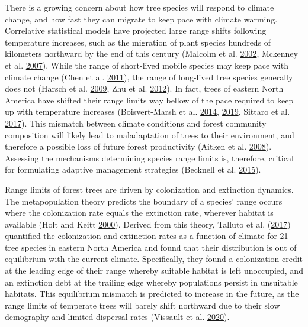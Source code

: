 \documentclass[12pt]{article}
\begin{document}
There is a growing concern about how tree species will respond to
climate change, and how fast they can migrate to keep pace with climate
warming. Correlative statistical models have projected large range
shifts following temperature increases, such as the migration of plant
species hundreds of kilometers northward by the end of this century
(Malcolm et al. \protect\hyperlink{ref-Malcolm2002}{2002}, Mckenney et
al. \protect\hyperlink{ref-Mckenney2007}{2007}). While the range of
short-lived mobile species may keep pace with climate change (Chen et
al. \protect\hyperlink{ref-Chen2011}{2011}), the range of long-lived
tree species generally does not (Harsch et al.
\protect\hyperlink{ref-Harsch2009}{2009}, Zhu et al.
\protect\hyperlink{ref-Zhu2012}{2012}). In fact, trees of eastern North
America have shifted their range limits way bellow of the pace required
to keep up with temperature increases (Boisvert-Marsh et al.
\protect\hyperlink{ref-BoisvertMarsh2014}{2014},
\protect\hyperlink{ref-BoisvertMarsh2019}{2019}, Sittaro et al.
\protect\hyperlink{ref-Sittaro2017}{2017}). This mismatch between
climate conditions and forest community composition will likely lead to
maladaptation of trees to their environment, and therefore a possible
loss of future forest productivity (Aitken et al.
\protect\hyperlink{ref-Aitken2008}{2008}). Assessing the mechanisms
determining species range limits is, therefore, critical for formulating
adaptive management strategies (Becknell et al.
\protect\hyperlink{ref-Becknell2015a}{2015}).

Range limits of forest trees are driven by colonization and extinction
dynamics. The metapopulation theory predicts the boundary of a species'
range occurs where the colonization rate equals the extinction rate,
wherever habitat is available (Holt and Keitt
\protect\hyperlink{ref-Holt2000}{2000}). Derived from this theory,
Talluto et al. (\protect\hyperlink{ref-Talluto2017}{2017}) quantified
the colonization and extinction rates as a function of climate for 21
tree species in eastern North America and found that their distribution
is out of equilibrium with the current climate. Specifically, they found
a colonization credit at the leading edge of their range whereby
suitable habitat is left unoccupied, and an extinction debt at the
trailing edge whereby populations persist in unsuitable habitats. This
equilibrium mismatch is predicted to increase in the future, as the
range limits of temperate trees will barely shift northward due to their
slow demography and limited dispersal rates (Vissault et al.
\protect\hyperlink{ref-Vissault2020}{2020}).
\end{document}
